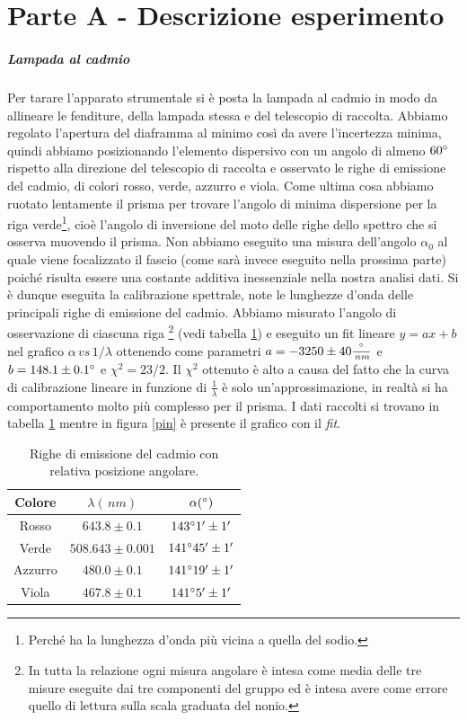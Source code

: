 \documentclass[10pt,a4paper]{article}
\begin{document}
\section{Parte A - Descrizione esperimento}
\subparagraph{Lampada al cadmio}
Per tarare l'apparato strumentale si è posta la lampada al cadmio in modo da allineare le fenditure, della lampada stessa e del telescopio di raccolta. Abbiamo regolato l'apertura del diaframma al minimo così da avere l'incertezza minima, quindi abbiamo posizionando l'elemento dispersivo con un angolo di almeno $60\degree$ rispetto alla direzione del telescopio di raccolta e osservato le righe di emissione del cadmio, di colori rosso, verde, azzurro e viola. Come ultima cosa abbiamo ruotato lentamente il prisma per trovare l'angolo di minima dispersione per la riga verde\footnote{Perché ha la lunghezza d'onda più vicina a quella del sodio.}, cioè l'angolo di inversione del moto delle righe dello spettro che si osserva muovendo il prisma. Non abbiamo eseguito una misura dell'angolo $\alpha_0$ al quale viene focalizzato il fascio (come sarà invece eseguito nella prossima parte) poiché risulta essere una costante additiva inessenziale nella nostra analisi dati.
Si è dunque eseguita la calibrazione spettrale, note le lunghezze d'onda delle principali righe di emissione del cadmio. Abbiamo misurato l'angolo di osservazione di ciascuna riga \footnote{In tutta la relazione ogni misura angolare è intesa come media delle tre misure eseguite dai tre componenti del gruppo ed è intesa avere come errore quello di lettura sulla scala graduata del nonio.} (vedi tabella \ref{cadmio}) e eseguito un fit lineare $y=ax+b$ nel grafico $\alpha\, \textit{vs}\, 1/\lambda$ ottenendo come parametri $a = -3250 \pm 40 \frac{\degree}{\,nm}$ e $ b = 148.1 \pm 0.1 \degree$ e $\chi^2=23/2$. Il $\chi^2$ ottenuto è alto a causa del fatto che la curva di calibrazione lineare in funzione di $\frac{1}{\lambda}$ è solo un'approssimazione, in realtà si ha comportamento molto più complesso per il prisma. I dati raccolti si trovano in tabella \ref{cadmio} mentre in figura \ref{pin} è presente il grafico con il \emph{fit}.

\begin{table}[!htb]
\centering
\begin{tabular}{|c|c|c|}
\hline 
Colore & $\lambda (\,nm)$ & $\alpha (\degree)$ \\
\hline
Rosso & $643.8\pm0.1$ & $143 \degree 1' \pm 1'$ \\ 
\hline 
Verde & $508.643 \pm 0.001$ & $141 \degree 45' \pm 1'$ \\ 
\hline 
Azzurro & $480.0 \pm 0.1$ & $141 \degree 19' \pm 1'$ \\ 
\hline 
Viola & $467.8 \pm 0.1$	& $141 \degree 5' \pm 1'$ \\ 
\hline 
\end{tabular} 
\caption{Righe di emissione del cadmio con relativa posizione angolare.}\label{cadmio}
\end{table}
\end{document}
